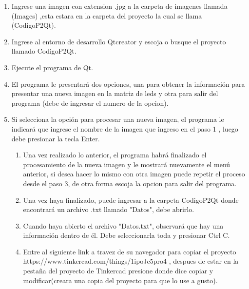 \documentclass{article}
\begin{document}
  \begin{enumerate}
  
        \item Ingrese una imagen con extension .jpg a la carpeta de imagenes llamada  (Images) ,esta estara en la carpeta del proyecto la cual se llama (CodigoP2Qt).
        
        \item Ingrese al entorno de desarrollo Qtcreator y escoja o busque el proyecto llamado CodigoP2Qt.\\
        
         \item Ejecute el programa de Qt.\\ 
         
         \item El programa le presentará dos opciones, una para obtener la información para presentar una nueva imagen en la matriz de leds y otra para salir del programa (debe de ingresar el numero de la opcion).\\
         
         \item Si selecciona la opción para procesar una nueva imagen, el programa le indicará que ingrese el nombre de la imagen que ingreso en el paso 1 , luego debe presionar la tecla Enter.\\
         
         \begin{enumerate}
         
         \item Una vez realizado lo anterior, el programa habrá finalizado el procesamiento de la nueva imagen y le mostrará nuevamente el menú anterior, si desea hacer lo mismo con otra imagen puede repetir el proceso desde el paso 3, de otra forma escoja la opcion para salir del programa.\\
    
        \item Una vez haya finalizado, puede ingresar a la carpeta CodigoP2Qt donde encontrará un archivo .txt llamado "Datos", debe abrirlo.\\
        
        \item Cuando haya abierto el archivo "Datos.txt",  observará que hay una información dentro de él. Debe seleccionarla toda y presionar Ctrl C.\\ 
        
        \item Entre al siguiente link a travez de su navegador para copiar el proyecto https://www.tinkercad.com/things/1ipoJc5pro4 , despues de estar en la pestaña del proyecto de Tinkercad presione donde dice copiar y modificar(creara una copia del proyecto para que lo use a gusto).\\


\end{enumerate}
\end{enumerate}
\end{document}
